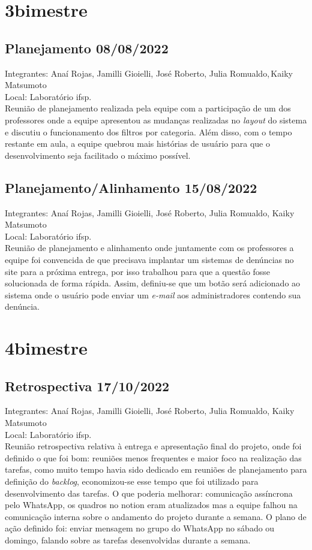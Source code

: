\section{3\textordmasculine bimestre}

\subsection{Planejamento 08/08/2022}
\noindent Integrantes: Anaí Rojas, Jamilli Gioielli, José Roberto, Julia Romualdo,\,Kaiky Matsumoto \\
Local: Laboratório \acs{ifsp}. \\
Reunião de planejamento realizada pela equipe com a participação de um dos professores onde a equipe apresentou as mudanças realizadas no \textit{layout} do sistema e discutiu o funcionamento dos filtros por categoria. Além disso, com o tempo restante em aula, a equipe quebrou mais histórias de usuário para que o desenvolvimento seja facilitado o máximo possível.

\subsection{Planejamento/Alinhamento 15/08/2022}
\noindent Integrantes: Anaí Rojas, Jamilli Gioielli, José Roberto, Julia Romualdo, Kaiky Matsumoto \\
Local: Laboratório \acs{ifsp}. \\
Reunião de planejamento e alinhamento onde juntamente com os professores a equipe foi convencida de que precisava implantar um sistemas de denúncias no site para a próxima entrega, por isso trabalhou para que a questão fosse solucionada de forma rápida. Assim, definiu-se que um botão será adicionado ao sistema onde o usuário pode enviar um \textit{ e-mail} aos administradores contendo sua denúncia. 

\section{4\textordmasculine bimestre}
\subsection{Retrospectiva 17/10/2022}
\noindent Integrantes: Anaí Rojas, Jamilli Gioielli, José Roberto, Julia Romualdo, Kaiky Matsumoto \\
Local: Laboratório \acs{ifsp}. \\
Reunião retrospectiva relativa à entrega e apresentação final do projeto, onde foi definido o que foi bom: reuniões menos frequentes e maior foco na realização das tarefas, como muito tempo havia sido dedicado em reuniões de planejamento para definição do \textit{backlog}, economizou-se esse tempo que foi utilizado para desenvolvimento das tarefas. O que poderia melhorar: comunicação assíncrona pelo \gls{WhatsApp}, os quadros no \gls{notion} eram  atualizados mas a equipe falhou na comunicação interna sobre o andamento do projeto durante a semana. O plano de ação definido foi: enviar mensagem no grupo do \gls{WhatsApp} no sábado ou domingo, falando sobre as tarefas desenvolvidas durante a semana.

